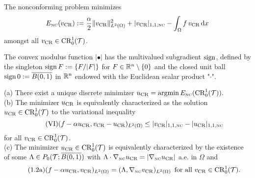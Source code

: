 The nonconforming problem minimizes
\begin{align}\label{e:defnonconfEintro}
E_\nc (\vcr) :=    \frac{\alpha}{2}   \|  \vcr \|_{L^2(\Omega)}^2 
+ | \vcr |_{1,1,\nc }  -\int_\Omega f\,  \vcr \dx
\end{align}
amongst all $\vcr\in \CR(\T)$.  
 

The convex modulus function $|\bullet|$ has the multivalued subgradient $\sign$, 
defined by the singleton
$\sign F:= \{ F/|F| \}$ for $F\in\R^n\setminus\{0\}$ and 
the closed unit ball $\sign 0:= \overline{ B(0,1)}$ in 
$\R^n$ endowed   with  the Euclidean scalar product "$\cdot$".   


\begin{theorem} 
  \label{thm:characterizationDiscreteSolutions}
(a) There exist a unique discrete minimizer
$
\ucr=\operatorname{argmin} E_\nc ( \CR(\T)).
$\\  
(b) The minimizer 
$\ucr$ is equivalently characterized as the solution $\ucr\in \CR(\T)$ to the variational inequality
\begin{equation}\label{eqccvarioineq} \tag{VI}
(f-\alpha\ucr, \vcr-\ucr)_{L^2(\Omega)}\le | \vcr |_{1,1,\nc }-| \ucr |_{1,1,\nc }
\end{equation}
for all $\vcr\in \CR(\T)$.
\\
(c) The minimizer $\ucr\in \CR(\T)$ is equivalently characterized by 
the existence of some
$\Lambda\in P_0(\T; \overline{ B(0,1)})$ with 
$\Lambda\cdot\nabla_\nc \ucr=|\nabla_\nc\ucr|$ a.e. in $\Omega$ and 
\begin{equation}
\label{eqLambda} \tag{1.2a}
(f-\alpha\ucr, \vcr)_{L^2(\Omega)}=(\Lambda,\nabla_\nc \vcr)_{L^2(\Omega)}
\,\text{ for all }\vcr\in \CR(\T).
\end{equation}
\end{theorem}


